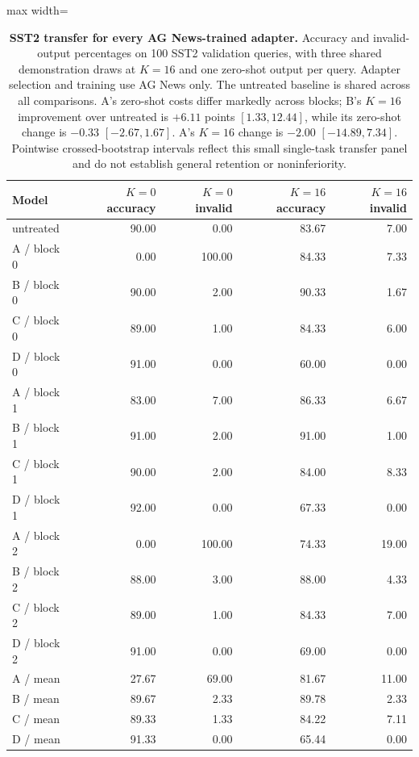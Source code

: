 \begin{table}[p]
\centering\color{blue}
\caption{\textbf{SST2 transfer for every AG News-trained adapter.} Accuracy and invalid-output percentages on 100 SST2 validation queries, with three shared demonstration draws at $K=16$ and one zero-shot output per query. Adapter selection and training use AG News only. The untreated baseline is shared across all comparisons. A's zero-shot costs differ markedly across blocks; B's $K=16$ improvement over untreated is $+6.11$ points $[1.33,12.44]$, while its zero-shot change is $-0.33$ $[-2.67,1.67]$. A's $K=16$ change is $-2.00$ $[-14.89,7.34]$. Pointwise crossed-bootstrap intervals reflect this small single-task transfer panel and do not establish general retention or noninferiority.}
\label{stab:final_transfer}
\footnotesize
\begin{adjustbox}{max width=\textwidth}
\begin{tabular}{lrrrr}
\toprule
Model & $K=0$ accuracy & $K=0$ invalid & $K=16$ accuracy & $K=16$ invalid \\
\midrule
untreated & 90.00 & 0.00 & 83.67 & 7.00 \\
A / block 0 & 0.00 & 100.00 & 84.33 & 7.33 \\
B / block 0 & 90.00 & 2.00 & 90.33 & 1.67 \\
C / block 0 & 89.00 & 1.00 & 84.33 & 6.00 \\
D / block 0 & 91.00 & 0.00 & 60.00 & 0.00 \\
A / block 1 & 83.00 & 7.00 & 86.33 & 6.67 \\
B / block 1 & 91.00 & 2.00 & 91.00 & 1.00 \\
C / block 1 & 90.00 & 2.00 & 84.00 & 8.33 \\
D / block 1 & 92.00 & 0.00 & 67.33 & 0.00 \\
A / block 2 & 0.00 & 100.00 & 74.33 & 19.00 \\
B / block 2 & 88.00 & 3.00 & 88.00 & 4.33 \\
C / block 2 & 89.00 & 1.00 & 84.33 & 7.00 \\
D / block 2 & 91.00 & 0.00 & 69.00 & 0.00 \\
A / mean & 27.67 & 69.00 & 81.67 & 11.00 \\
B / mean & 89.67 & 2.33 & 89.78 & 2.33 \\
C / mean & 89.33 & 1.33 & 84.22 & 7.11 \\
D / mean & 91.33 & 0.00 & 65.44 & 0.00 \\
\bottomrule
\end{tabular}
\end{adjustbox}
\end{table}

\endgroup
